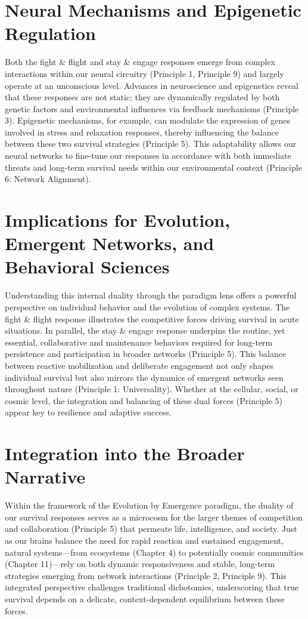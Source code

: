 \section{Neural Mechanisms and Epigenetic Regulation}
Both the fight \& flight and stay \& engage responses emerge from complex interactions within our neural circuitry (Principle 1, Principle 9) and largely operate at an unconscious level. Advances in neuroscience and epigenetics reveal that these responses are not static; they are dynamically regulated by both genetic factors and environmental influences via feedback mechanisms (Principle 3). Epigenetic mechanisms, for example, can modulate the expression of genes involved in stress and relaxation responses, thereby influencing the balance between these two survival strategies (Principle 5). This adaptability allows our neural networks to fine-tune our responses in accordance with both immediate threats and long-term survival needs within our environmental context (Principle 6: Network Alignment). %

\section{Implications for Evolution, Emergent Networks, and Behavioral Sciences}
Understanding this internal duality through the paradigm lens offers a powerful perspective on individual behavior and the evolution of complex systems. The fight \& flight response illustrates the competitive forces driving survival in acute situations. In parallel, the stay \& engage response underpins the routine, yet essential, collaborative and maintenance behaviors required for long-term persistence and participation in broader networks (Principle 5). This balance between reactive mobilization and deliberate engagement not only shapes individual survival but also mirrors the dynamics of emergent networks seen throughout nature (Principle 1: Universality). Whether at the cellular, social, or cosmic level, the integration and balancing of these dual forces (Principle 5) appear key to resilience and adaptive success. %

\section{Integration into the Broader Narrative}
Within the framework of the Evolution by Emergence paradigm, the duality of our survival responses serves as a microcosm for the larger themes of competition and collaboration (Principle 5) that permeate life, intelligence, and society. Just as our brains balance the need for rapid reaction and sustained engagement, natural systems—from ecosystems (Chapter 4) to potentially cosmic communities (Chapter 11)—rely on both dynamic responsiveness and stable, long-term strategies emerging from network interactions (Principle 2, Principle 9). This integrated perspective challenges traditional dichotomies, underscoring that true survival depends on a delicate, context-dependent equilibrium between these forces. %

